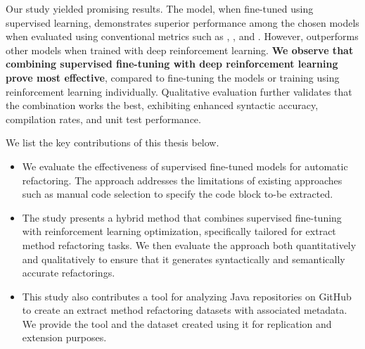 Our study yielded promising results. 
The \plbart{} model,
when fine-tuned using supervised learning,
demonstrates superior performance among the chosen models
when evaluated using conventional metrics such as \bleu{},
\rouge{}, and \codebleu{}.
However, \codetf{} outperforms other models when trained with deep reinforcement learning.
\textbf{We observe that combining supervised fine-tuning with deep reinforcement learning prove most effective},
compared to fine-tuning the models or training using reinforcement learning individually.
Qualitative evaluation further validates that the combination works the best, exhibiting enhanced syntactic accuracy, compilation rates, and unit test performance. 

We list the key contributions of this thesis below.
\begin{itemize}
    \item We evaluate the effectiveness of supervised fine-tuned models for automatic \exm{} refactoring.
    The approach addresses the limitations of existing approaches such as manual code selection to specify the code block to-be extracted.
    \item The study presents a hybrid method that combines supervised fine-tuning with reinforcement learning optimization, specifically tailored for extract method refactoring tasks. We then evaluate the approach both quantitatively and qualitatively to ensure that it generates syntactically and semantically accurate refactorings.
    \item This study also contributes a tool for analyzing Java repositories on GitHub to create an extract method refactoring datasets with associated metadata. We provide the tool and the dataset created using it for replication and extension purposes.
\end{itemize}
